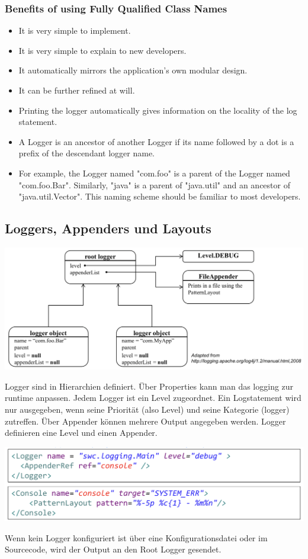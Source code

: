 \documentclass[10pt]{article}
\begin{document}
	\subsubsection{Benefits of using Fully Qualified Class Names}
	\begin{itemize}
		\item It is very simple to implement.
		\item It is very simple to explain to new developers.
		\item It automatically mirrors the application's own modular design.
		\item It can be further refined at will.
		\item Printing the logger automatically gives information on the locality of the log statement.
		\item A Logger is an ancestor of another Logger if its name followed by a dot is a prefix of the descendant logger name.
		\item For example, the Logger named "com.foo" is a parent of the Logger named "com.foo.Bar". Similarly, "java" is a parent of "java.util" and an ancestor of "java.util.Vector". This naming scheme should be familiar to most developers.
	\end{itemize}
	\subsection{Loggers, Appenders und Layouts}
	\begin{center}
		\includegraphics[scale=0.4]{assets/loggers_appenders_layouts}
	\end{center}
	Logger sind in Hierarchien definiert. Über Properties kann man das logging zur runtime anpassen. Jedem Logger ist ein Level zugeordnet. Ein Logstatement wird nur ausgegeben, wenn seine Priorität (also Level) und seine Kategorie (logger) zutreffen. \"Uber Appender können mehrere Output angegeben werden. Logger definieren eine Level und einen Appender.\\
	\begin{center}
		\includegraphics[scale=0.4]{assets/logger_example}
	\end{center}
	Wenn kein Logger konfiguriert ist über eine Konfigurationsdatei oder im Sourcecode, wird der Output an den Root Logger gesendet.
	
\end{document}
